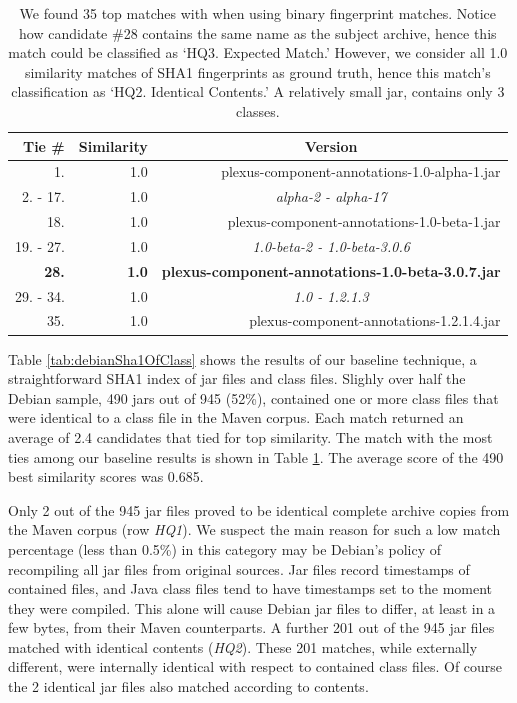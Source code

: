 \begin{table}[h]
  \centering
\begin{tabular}[htbp]{r|r|r}
\textbf{Tie \#}  & \textbf{Similarity} & \multicolumn{1}{c}{\textbf{Version}} \\
\hline
1.        & 1.0 &          plexus-component-annotations-1.0-alpha-1.jar  \\
2. - 17.  & 1.0 &                            \multicolumn{1}{c}{\emph{alpha-2 - alpha-17}}  \\
18.       & 1.0 &           plexus-component-annotations-1.0-beta-1.jar  \\
19. - 27. & 1.0 &                   \multicolumn{1}{c}{\emph{1.0-beta-2 - 1.0-beta-3.0.6}}  \\
\textbf{28.}       & \textbf{1.0} &       \textbf{plexus-component-annotations-1.0-beta-3.0.7.jar}  \\
29. - 34. & 1.0 &                                 \multicolumn{1}{c}{\emph{1.0 - 1.2.1.3}}  \\
35.       & 1.0 &              plexus-component-annotations-1.2.1.4.jar  \\
\end{tabular}
  \caption{
    We found 35 top matches with
     when using
    binary fingerprint matches.  Notice how candidate \#28 contains the
    same name as the subject archive, hence this match could be classified
    as `HQ3. Expected Match.' However, we consider all 1.0 similarity
    matches of SHA1 fingerprints as ground truth, hence this match's
    classification as `HQ2. Identical Contents.' A relatively small jar,
     contains only 3
    classes.  
}
  \label{tab:sha1-of-class-35-matches}
\end{table}

Table \ref{tab:debianSha1OfClass} shows the results of our baseline
technique, a straightforward SHA1 index of jar files and class files.
Slighly over half the Debian sample, 490 jars out of 945 (52\%), contained
one or more class files that were identical to a class file in the Maven
corpus.  Each match returned an average of 2.4 candidates that tied for top
similarity.  The match with the most ties among our baseline results is
shown in Table \ref{tab:sha1-of-class-35-matches}.  The average score of
the 490 best similarity scores was 0.685.

Only 2 out of the 945 jar files proved to be identical complete archive
copies from the Maven corpus (row \emph{HQ1}).  We suspect the main reason
for such a low match percentage (less than 0.5\%) in this category may be
Debian's policy of recompiling all jar files from original sources.  Jar
files record timestamps of contained files, and Java class files tend to
have timestamps set to the moment they were compiled.  This alone will
cause Debian jar files to differ, at least in a few bytes, from their Maven
counterparts.  A further 201 out of the 945 jar files matched with
identical contents (\emph{HQ2}).  These 201 matches, while externally
different, were internally identical with respect to contained class files.
Of course the 2 identical jar files also matched according to contents.

